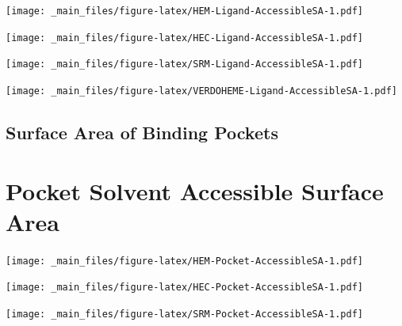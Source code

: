 \documentclass[a4paper, nobind]{templates/ociamthesis}
\let\origfigure\figure
\let\endorigfigure\endfigure
\renewenvironment{figure}[1][2] {
    \expandafter\origfigure\expandafter[H]
} {
    \endorigfigure
}
\begin{document}
\begin{figure}
\centering
\texttt{[image: \_main\_files/figure-latex/HEM-Ligand-AccessibleSA-1.pdf]}
\caption{\label{fig:HEM-Ligand-AccessibleSA}HEM: Ligand Accessible Surface Area}
\end{figure}

\begin{figure}
\centering
\texttt{[image: \_main\_files/figure-latex/HEC-Ligand-AccessibleSA-1.pdf]}
\caption{\label{fig:HEC-Ligand-AccessibleSA}HEC: Ligand Accessible Surface Area}
\end{figure}

\begin{figure}
\centering
\texttt{[image: \_main\_files/figure-latex/SRM-Ligand-AccessibleSA-1.pdf]}
\caption{\label{fig:SRM-Ligand-AccessibleSA}SRM: Ligand Accessible Surface Area}
\end{figure}

\begin{figure}
\centering
\texttt{[image: \_main\_files/figure-latex/VERDOHEME-Ligand-AccessibleSA-1.pdf]}
\caption{\label{fig:VERDOHEME-Ligand-AccessibleSA}VERDOHEME: Ligand Accessible Surface Area}
\end{figure}

\hypertarget{surface-area-of-binding-pockets}{%
\subsection{Surface Area of Binding Pockets}\label{surface-area-of-binding-pockets}}

\hypertarget{figs-pocketAccSA}{%
\section{Pocket Solvent Accessible Surface Area}\label{figs-pocketAccSA}}

\begin{figure}
\centering
\texttt{[image: \_main\_files/figure-latex/HEM-Pocket-AccessibleSA-1.pdf]}
\caption{\label{fig:HEM-Pocket-AccessibleSA}HEM: Pocket Accessible Surface Area}
\end{figure}

\begin{figure}
\centering
\texttt{[image: \_main\_files/figure-latex/HEC-Pocket-AccessibleSA-1.pdf]}
\caption{\label{fig:HEC-Pocket-AccessibleSA}HEC: Pocket Accessible Surface Area}
\end{figure}

\begin{figure}
\centering
\texttt{[image: \_main\_files/figure-latex/SRM-Pocket-AccessibleSA-1.pdf]}
\caption{\label{fig:SRM-Pocket-AccessibleSA}SRM: Pocket Accessible Surface Area}
\end{figure}
\end{document}
